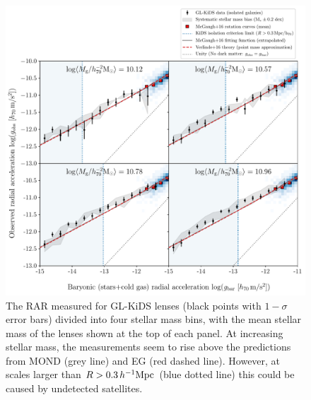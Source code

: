 \documentclass[usenatbib]{mnras}
\newcommand{\hMpc}{\, h^{-1}{\rm{Mpc}} }
\begin{document}
\begin{figure}
	\includegraphics[width=\textwidth]{Figures/RAR_KiDS+Verlinde_4-massbins_isolated.pdf}
	\caption{The RAR measured for GL-KiDS lenses (black points with $1-\sigma$ error bars) divided into four stellar mass bins, with the mean stellar mass of the lenses shown at the top of each panel. At increasing stellar mass, the measurements seem to rise above the predictions from MOND (grey line) and EG (red dashed line). However, at scales larger than $R > 0.3 \hMpc$ (blue dotted line) this could be caused by undetected satellites.}
	\label{fig:RAR_kids_verlinde_mstarbins}
\end{figure}
\end{document}
